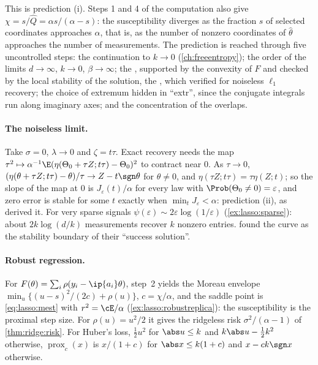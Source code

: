 \begin{refsection}
This is prediction (i). Steps 1 and 4 of the computation also give $\chi=s/\hat Q=\alpha s/(\alpha-s)$: the susceptibility diverges as the fraction $s$ of selected coordinates approaches $\alpha$, that is, as the number of nonzero coordinates of $\hat\theta$ approaches the number of measurements. The prediction is reached through five uncontrolled steps: the continuation to $k\to0$ (\cref{ch:freeentropy}); the order of the limits $d\to\infty$, $k\to0$, $\beta\to\infty$; the , supported by the convexity of $F$ and checked by the local stability of the solution, the , which \textcite{KabashimaEtAl2009} verified for noiseless $\ell_1$ recovery; the choice of extremum hidden in ``extr'', since the conjugate integrals run along imaginary axes; and the concentration of the overlaps.

\paragraph{The noiseless limit.} Take $\sigma=0$, $\lambda\to0$ and $\zeta=t\tau$. Exact recovery needs the map $\tau^2\mapsto\alpha^{-1}\E(\eta(\Theta_0+\tau Z;t\tau)-\Theta_0)^2$ to contract near $0$. As $\tau\to0$, $(\eta(\theta+\tau Z;t\tau)-\theta)/\tau\to Z-t\sgn\theta$ for $\theta\ne0$, and $\eta(\tau Z;t\tau)=\tau\eta(Z;t)$; so the slope of the map at $0$ is $J_\varepsilon(t)/\alpha$ for every law with $\Prob(\Theta_0\ne0)=\varepsilon$, and zero error is stable for some $t$ exactly when $\min_tJ_\varepsilon<\alpha$: prediction (ii), as \textcite{DonohoMalekiMontanari2009} derived it. For very sparse signals $\psi(\varepsilon)\sim2\varepsilon\log(1/\varepsilon)$ (\cref{ex:lasso:sparse}): about $2k\log(d/k)$ measurements recover $k$ nonzero entries. \Textcite{KabashimaEtAl2009} found the curve as the stability boundary of their ``success solution''.

\paragraph{Robust regression.} For $F(\theta)=\sum_i\rho(y_i-\ip{a_i}\theta)$, step~2 yields the Moreau envelope $\min_u\{(u-s)^2/(2c)+\rho(u)\}$, $c=\chi/\alpha$, and the saddle point is \eqref{eq:lasso:mest} with $r^2=\cE/\alpha$ (\cref{ex:lasso:robustreplica}): the susceptibility is the proximal step size. For $\rho(u)=u^2/2$ it gives the ridgeless risk $\sigma^2/(\alpha-1)$ of \cref{thm:ridge:risk}. For Huber's loss, $\frac12u^2$ for $\abs u\le k$ and $k\abs u-\frac12k^2$ otherwise, $\operatorname{prox}_c(x)$ is $x/(1+c)$ for $\abs x\le k(1+c)$ and $x-ck\sgn x$ otherwise.


\end{refsection}
